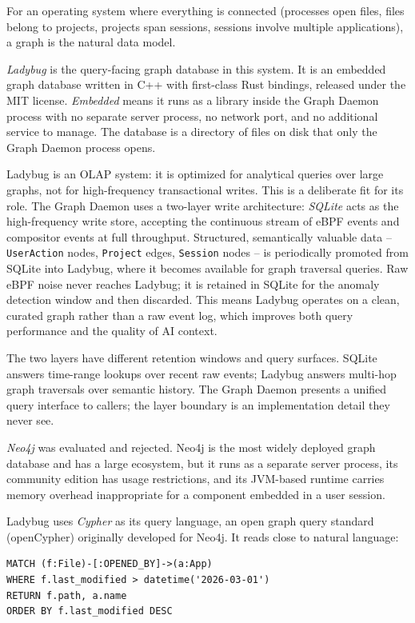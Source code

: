 For an operating system where everything is connected (processes open files,
files belong to projects, projects span sessions, sessions involve multiple
applications), a graph is the natural data model.

\emph{Ladybug} is the query-facing graph database in this system. It is an embedded
graph database written in C++ with first-class Rust bindings, released under the
MIT license. \emph{Embedded} means it runs as a library inside the Graph Daemon
process with no separate server process, no network port, and no additional
service to manage. The database is a directory of files on disk that only the
Graph Daemon process opens.

Ladybug is an OLAP system: it is optimized for analytical queries over large graphs,
not for high-frequency transactional writes. This is a deliberate fit for its
role. The Graph Daemon uses a two-layer write architecture: \emph{SQLite} acts
as the high-frequency write store, accepting the continuous stream of eBPF
events and compositor events at full throughput. Structured, semantically
valuable data -- \texttt{UserAction} nodes, \texttt{Project} edges,
\texttt{Session} nodes -- is periodically promoted from SQLite into Ladybug, where
it becomes available for graph traversal queries. Raw eBPF noise never reaches
Ladybug; it is retained in SQLite for the anomaly detection window and then
discarded. This means Ladybug operates on a clean, curated graph rather than a
raw event log, which improves both query performance and the quality of AI
context.

The two layers have different retention windows and query surfaces. SQLite
answers time-range lookups over recent raw events; Ladybug answers multi-hop
graph traversals over semantic history. The Graph Daemon presents a unified
query interface to callers; the layer boundary is an implementation detail
they never see.

\emph{Neo4j} was evaluated and rejected. Neo4j is the most widely deployed
graph database and has a large ecosystem, but it runs as a separate server
process, its community edition has usage restrictions, and its JVM-based runtime
carries memory overhead inappropriate for a component embedded in a user session.

Ladybug uses \emph{Cypher} as its query language, an open graph query standard
(openCypher) originally developed for Neo4j. It reads close to natural language:

\begin{lstlisting}[language={}]
MATCH (f:File)-[:OPENED_BY]->(a:App)
WHERE f.last_modified > datetime('2026-03-01')
RETURN f.path, a.name
ORDER BY f.last_modified DESC
\end{lstlisting}

